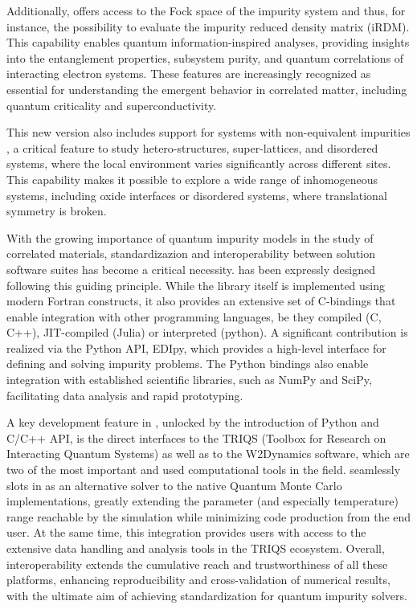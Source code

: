\documentclass[edipack2.tex]{subfiles}
\begin{document}
Additionally, \NAME offers access to the Fock space of
the impurity system and thus, for instance, the possibility to
evaluate the impurity reduced density matrix
(iRDM). This capability enables quantum information-inspired analyses, providing insights into the entanglement properties, subsystem purity, and quantum correlations of interacting electron systems. These
features are increasingly recognized as essential for understanding the emergent behavior in correlated matter, including quantum criticality and superconductivity.

This new version also includes support for systems with non-equivalent impurities , a critical feature to study hetero-structures, super-lattices, and disordered systems, where the local environment varies significantly across different sites. This capability makes it 
possible to explore a wide range of inhomogeneous systems, including
oxide interfaces or disordered systems, where
translational symmetry is broken.


With the growing importance of  quantum impurity models in the study of correlated materials,
standardizazion and interoperability between solution software suites has
become a critical necessity.
\NAME has been expressly designed following this guiding principle. 
While the library itself is implemented using modern Fortran constructs, it also provides an extensive set of C-bindings that enable integration with other programming languages,
be they compiled (C, C++), JIT-compiled (Julia) or interpreted (python). 
A significant contribution is realized via the Python API, EDIpy, which provides a high-level interface for defining and solving impurity problems. The
Python bindings also enable integration with established scientific
libraries, such as NumPy and SciPy, facilitating data analysis and
rapid prototyping.

A key development feature in \NAME, unlocked by the introduction of Python and C/C++ API, 
is the direct  interfaces to the TRIQS (Toolbox for Research on Interacting Quantum Systems)  as
well as to the W2Dynamics software, which are two of the most 
important and used computational tools in the field. \NAME seamlessly slots in as an alternative
solver to the native Quantum Monte Carlo implementations, greatly extending the parameter (and 
especially temperature) range reachable by the simulation while minimizing code production from 
the end user.
At the same time, this integration provides \NAME users with access to the
extensive data handling and analysis tools in the TRIQS ecosystem. 
Overall, interoperability extends the cumulative reach and trustworthiness of all these platforms,
enhancing reproducibility and cross-validation of numerical results, with the ultimate aim of achieving standardization for quantum impurity solvers.
\end{document}
